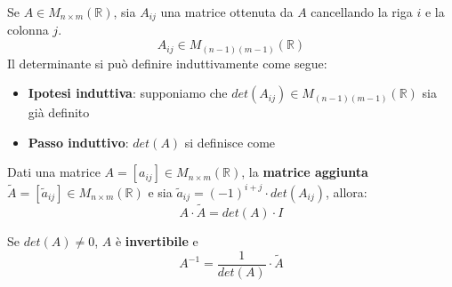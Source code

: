 \begin{definition}
	Se $A \in M_{n \times m}(\mathbb{R})$, sia $A_{ij}$ una matrice ottenuta da $A$ cancellando la riga $i$ e la colonna $j$.
	\begin{equation*}
		A_{ij} \in M_{(n-1)(m-1)}(\mathbb{R})
	\end{equation*}
	Il determinante si può definire induttivamente come segue:
	\begin{itemize}
		\item \textbf{Ipotesi induttiva}: supponiamo che $det(A_{ij}) \in M_{(n-1)(m-1)}(\mathbb{R})$ sia già definito
		\item  \textbf{Passo induttivo}: $det(A)$ si definisce come 
	\end{itemize}
\end{definition}
\begin{definition}
	Dati una matrice $A = [a_{ij}] \in M_{n \times m}(\mathbb{R})$, la \textbf{matrice aggiunta} $\tilde{A} = [\tilde{a}_{ij}] \in M_{n \times m}(\mathbb{R})$ e sia $\tilde{a}_{ij} = (-1)^{i+j} \cdot det(A_{ij})$, allora:
	\begin{equation*}
		A \cdot \tilde{A} = det(A) \cdot I
	\end{equation*}
\end{definition}
\begin{corollary}
	Se $det(A) \neq 0$, $A$ è \textbf{invertibile} e
	\begin{equation*}
		A^{-1} = \frac{1}{det(A)} \cdot \tilde{A}
	\end{equation*}
\end{corollary}
